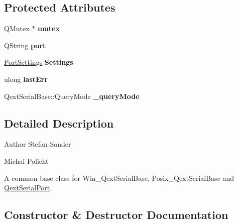 \subsection*{Protected Attributes}
\begin{DoxyCompactItemize}
\item 
\mbox{\label{class_qext_serial_base_a0c7cf6443ad80a05d51daaca5d0102ab}} 
Q\+Mutex $\ast$ {\bfseries mutex}
\item 
\mbox{\label{class_qext_serial_base_a7459f3818391091877c88595a48a950a}} 
Q\+String {\bfseries port}
\item 
\mbox{\label{class_qext_serial_base_a2d796e3080f78ff63e821f528439db57}} 
\mbox{\hyperlink{struct_port_settings}{Port\+Settings}} {\bfseries Settings}
\item 
\mbox{\label{class_qext_serial_base_a31816951ba89902fa1dfdb6f18b80f41}} 
ulong {\bfseries last\+Err}
\item 
\mbox{\label{class_qext_serial_base_a67f8a0fb2ce91824c1afc6c95e6b3c3a}} 
Qext\+Serial\+Base\+::\+Query\+Mode {\bfseries \+\_\+query\+Mode}
\end{DoxyCompactItemize}


\subsection{Detailed Description}
\begin{DoxyAuthor}{Author}
Stefan Sander 

Michal Policht
\end{DoxyAuthor}
A common base class for Win\+\_\+\+Qext\+Serial\+Base, Posix\+\_\+\+Qext\+Serial\+Base and \mbox{\hyperlink{class_qext_serial_port}{Qext\+Serial\+Port}}. 

\subsection{Constructor \& Destructor Documentation}
\mbox{\label{class_qext_serial_base_aba0fc6d8b5c675c91ebff90fc6415748}} 
